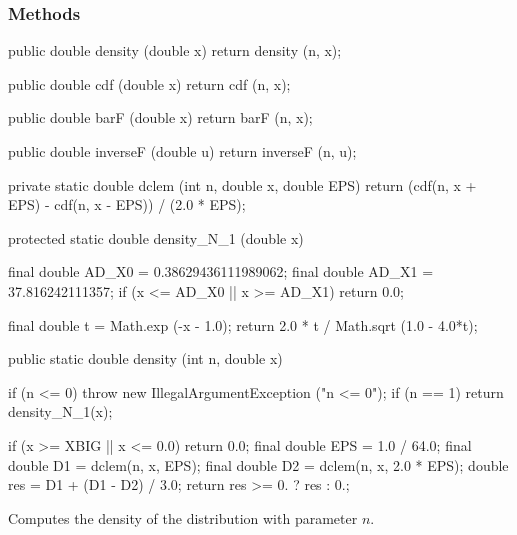 \subsubsection* {Methods}

\begin{code}\begin{hide}

   public double density (double x) {
      return density (n, x);
   }

   public double cdf (double x) {
      return cdf (n, x);
   }

   public double barF (double x) {
      return barF (n, x);
   }

   public double inverseF (double u) {
      return inverseF (n, u);
   }

   private static double dclem (int n, double x, double EPS) {
      return (cdf(n, x + EPS) - cdf(n, x - EPS)) / (2.0 * EPS);
   }

   protected static double density_N_1 (double x)
   {
      final double AD_X0 = 0.38629436111989062;
      final double AD_X1 = 37.816242111357;
      if (x <= AD_X0 || x >= AD_X1)
         return 0.0;

      final double t = Math.exp (-x - 1.0);
      return 2.0 * t / Math.sqrt (1.0 - 4.0*t);
   }\end{hide}

   public static double density (int n, double x)\begin{hide} {
      if (n <= 0)
         throw new IllegalArgumentException ("n <= 0");
      if (n == 1)
         return density_N_1(x);

      if (x >= XBIG || x <= 0.0)
         return 0.0;
      final double EPS = 1.0 / 64.0;
      final double D1 = dclem(n, x, EPS);
      final double D2 = dclem(n, x, 2.0 * EPS);
      double res = D1 + (D1 - D2) / 3.0;
      return res >= 0. ? res : 0.;
   }\end{hide}
\end{code}
\begin{tabb} Computes the density of the \ad{} distribution with parameter $n$.
\end{tabb}
